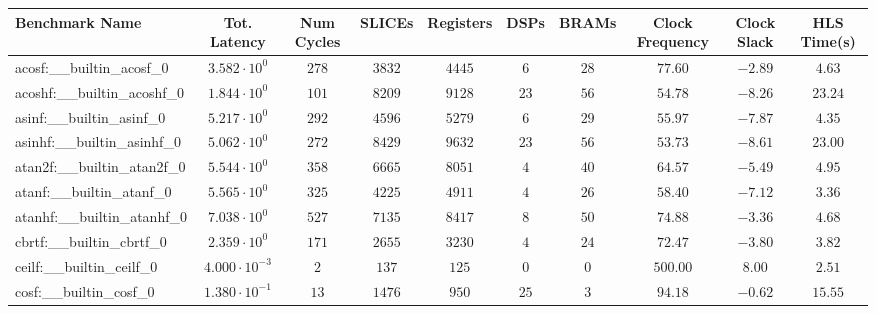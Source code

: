 \begin{tabular}{|l|c|c|c|c|c|c|c|c|c|}
\hline
Benchmark Name                            & Tot. Latency            & Num Cycles & SLICEs     & Registers  & DSPs    & BRAMs   & Clock Frequency & Clock Slack & HLS Time(s) \\
\hline
acosf:\_\_builtin\_acosf\_0               & $ 3.582 \cdot 10^{0}  $ & $ 278    $ & $ 3832   $ & $ 4445   $ & $ 6   $ & $ 28  $ & $ 77.60       $ & $ -2.89   $ & $ 4.63    $ \\
acoshf:\_\_builtin\_acoshf\_0             & $ 1.844 \cdot 10^{0}  $ & $ 101    $ & $ 8209   $ & $ 9128   $ & $ 23  $ & $ 56  $ & $ 54.78       $ & $ -8.26   $ & $ 23.24   $ \\
asinf:\_\_builtin\_asinf\_0               & $ 5.217 \cdot 10^{0}  $ & $ 292    $ & $ 4596   $ & $ 5279   $ & $ 6   $ & $ 29  $ & $ 55.97       $ & $ -7.87   $ & $ 4.35    $ \\
asinhf:\_\_builtin\_asinhf\_0             & $ 5.062 \cdot 10^{0}  $ & $ 272    $ & $ 8429   $ & $ 9632   $ & $ 23  $ & $ 56  $ & $ 53.73       $ & $ -8.61   $ & $ 23.00   $ \\
atan2f:\_\_builtin\_atan2f\_0             & $ 5.544 \cdot 10^{0}  $ & $ 358    $ & $ 6665   $ & $ 8051   $ & $ 4   $ & $ 40  $ & $ 64.57       $ & $ -5.49   $ & $ 4.95    $ \\
atanf:\_\_builtin\_atanf\_0               & $ 5.565 \cdot 10^{0}  $ & $ 325    $ & $ 4225   $ & $ 4911   $ & $ 4   $ & $ 26  $ & $ 58.40       $ & $ -7.12   $ & $ 3.36    $ \\
atanhf:\_\_builtin\_atanhf\_0             & $ 7.038 \cdot 10^{0}  $ & $ 527    $ & $ 7135   $ & $ 8417   $ & $ 8   $ & $ 50  $ & $ 74.88       $ & $ -3.36   $ & $ 4.68    $ \\
cbrtf:\_\_builtin\_cbrtf\_0               & $ 2.359 \cdot 10^{0}  $ & $ 171    $ & $ 2655   $ & $ 3230   $ & $ 4   $ & $ 24  $ & $ 72.47       $ & $ -3.80   $ & $ 3.82    $ \\
ceilf:\_\_builtin\_ceilf\_0               & $ 4.000 \cdot 10^{-3} $ & $ 2      $ & $ 137    $ & $ 125    $ & $ 0   $ & $ 0   $ & $ 500.00      $ & $ 8.00    $ & $ 2.51    $ \\
cosf:\_\_builtin\_cosf\_0                 & $ 1.380 \cdot 10^{-1} $ & $ 13     $ & $ 1476   $ & $ 950    $ & $ 25  $ & $ 3   $ & $ 94.18       $ & $ -0.62   $ & $ 15.55   $ \\

\end{tabular}
